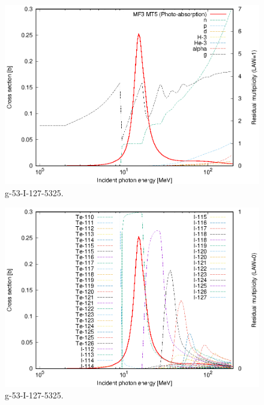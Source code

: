 \begin{figure}
 \includegraphics[width=\linewidth]{eps/g_53-I-127_5325.eps}
  \caption{g-53-I-127-5325.}
\end{figure}
\begin{figure}
 \includegraphics[width=\linewidth]{eps-law0/g_53-I-127_5325.eps}
 \caption{g-53-I-127-5325.}
\end{figure}
\newpage \clearpage

